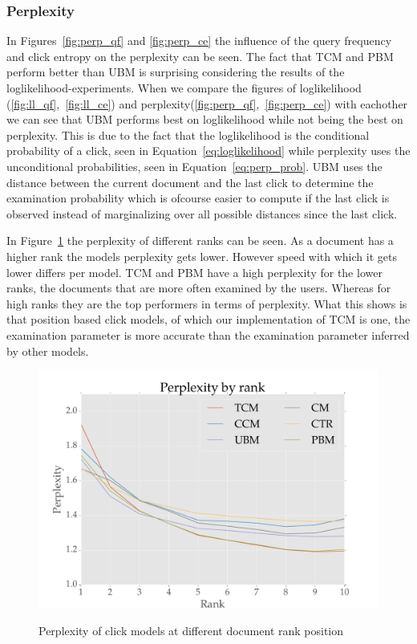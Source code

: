 \subsubsection{Perplexity}
In Figures~\ref{fig:perp_qf} and \ref{fig:perp_ce} the influence of the query frequency and click entropy on the perplexity can be seen. The fact that TCM and PBM perform better than UBM is surprising considering the results of the loglikelihood-experiments. When we compare the figures of loglikelihood (\ref{fig:ll_qf},~\ref{fig:ll_ce}) and perplexity(\ref{fig:perp_qf},~\ref{fig:perp_ce}) with eachother we can see that UBM performs best on loglikelihood while not being the best on perplexity. This is due to the fact that the loglikelihood is the conditional probability of a click, seen in Equation~\ref{eq:loglikelihood} while perplexity uses the unconditional probabilities, seen in Equation~\ref{eq:perp_prob}. UBM uses the distance between the current document and the last click to determine the examination probability which is ofcourse easier to compute if the last click is observed instead of marginalizing over all possible distances since the last click.

In Figure~\ref{fig:perp_rank} the perplexity of different ranks can be seen. As a document has a higher rank the models perplexity gets lower. However speed with which it gets lower differs per model. TCM and PBM have a high perplexity for the lower ranks, the documents that are more often examined by the users. Whereas for high ranks they are the top performers in terms of perplexity. What this shows is that position based click models, of which our implementation of TCM is one, the examination parameter is more accurate than the examination parameter inferred by other models.

\begin{figure}
	\centering
	\includegraphics[width=.8\textwidth]{figures/Perp_rank.pdf}
	\label{fig:perp_rank}
	\caption{Perplexity of click models at different document rank position}
\end{figure}

